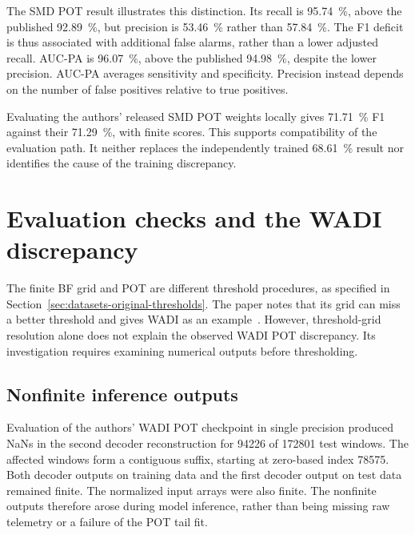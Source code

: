 The \ac{SMD} \ac{POT} result illustrates this distinction. Its recall is
\SI{95.74}{\percent}, above the published \SI{92.89}{\percent}, but
precision is \SI{53.46}{\percent} rather than \SI{57.84}{\percent}.
The F1 deficit is thus associated with additional false alarms, rather
than a lower adjusted recall. AUC-PA is \SI{96.07}{\percent}, above the published
\SI{94.98}{\percent}, despite the lower precision. AUC-PA averages
sensitivity and specificity. Precision instead
depends on the number of false positives relative to true positives.

Evaluating the authors' released \ac{SMD} \ac{POT} weights locally gives
\SI{71.71}{\percent} F1 against their \SI{71.29}{\percent}, with finite
scores. This supports compatibility of the evaluation path. It neither
replaces the independently trained \SI{68.61}{\percent} result nor
identifies the cause of the training discrepancy.

\section{Evaluation checks and the WADI discrepancy}
\label{sec:replication-thresholds}
The finite BF grid and \ac{POT} are different threshold procedures, as
specified in Section~\ref{sec:datasets-original-thresholds}. The paper
notes that its grid can miss a better threshold and gives WADI as an
example~\cite{Yermakov2025TranADPlus}. However, threshold-grid resolution
alone does not explain the observed WADI \ac{POT} discrepancy. Its
investigation requires examining numerical outputs before thresholding.

\subsection{Nonfinite inference outputs}
Evaluation of the authors' WADI \ac{POT} checkpoint in single precision
produced NaNs in the second decoder reconstruction for \num{94226} of
\num{172801} test windows. The affected windows form a contiguous suffix,
starting at zero-based index \num{78575}. Both decoder outputs on training
data and the first decoder output on test data remained finite. The
normalized input arrays were also finite. The nonfinite outputs
therefore arose during model inference, rather than being missing raw
telemetry or a failure of the \ac{POT} tail fit.


